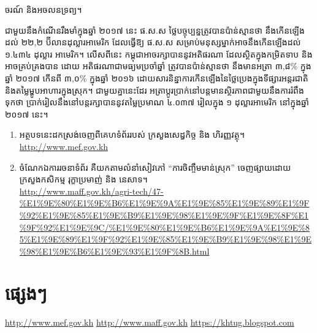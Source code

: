 \documentclass{maff}
\begin{document}
ចរណ៍ និង​អចលនទ្រព្យ។
\par
ជាមួយនឹង​កំណើន​រឹងមាំ​ក្នុង​ឆ្នាំ ២០១៧ នេះ ផ.ស.ស ថ្លៃ​បច្ចុប្បន្ន​ត្រូវបាន​ប៉ាន់ស្មាន​ថា នឹង​កើនឡើង​ដល់ ២២,២ ប៊ីលាន​ដុល្លារ​អាមេរិក  ដែល​ធ្វើឱ្យ ផ.ស.ស សម្រាប់​មនុស្ស​ម្នាក់​អាច​នឹង​កើន​ឡើងដល់ ១.៤៣៤ ដុល្លារ អាមេរិក។ លើសពីនេះ កម្ពុជា​អាច​រក្សាបាន​នូវ​អតិផរណា ដែល​ស្ថិតក្នុង​កម្រិតទាប និង​អាច​គ្រប់គ្រង​បាន ដោយ អតិផរណា​ជាមធ្យម​ប្រចាំឆ្នាំ ត្រូវបាន​ប៉ាន់ស្មាន​ថា នឹងមាន​អត្រា ៣,៨\% ក្នុង​ឆ្នាំ ២០១៧ កើន​ពី ៣,០\% ក្នុង​ឆ្នាំ ២០១៦ ដោយសារ​និន្នាការ​កើនឡើង​នៃ​ថ្លៃ​ប្រេង​ក្នុង​ទីផ្សារ​អន្តរជាតិ និង​តម្លៃ​ម្ហូបអាហារ​ក្នុងស្រុក។ ជាមួយគ្នានេះដែរ អត្រា​ប្តូរប្រាក់​នៅ​បន្ត​មាន​ស្ថិរភាព​ជាមួយនឹង​ការរំពឹងទុក​ថា ប្រាក់រៀល​នឹង​នៅ​បន្ត​រក្សាបាន​នូវ​តម្លៃ​ប្រមាណ ៤.០៣៧ រៀល​ក្នុង ១ ដុល្លារ​អាមេរិក នៅក្នុង​ឆ្នាំ ២០១៧ នេះ។
\begin{tcolorbox}[title={សម្គាល់!}]
	\strut
	\begin{enumerate}[k]
		\item អត្ថបទនេះដកស្រង់ចេញពីគេហទំព័ររបស់ ក្រសួងសេដ្ធកិច្ច និង ហិរញ្ញវត្ថុ។\\
		\url{http://www.mef.gov.kh}\\
		\item ចំណែកឯការរចនាទំព័រ គឺយកតាមលំនាំសៀវភៅ ``ការចិញ្ចឹមមាន់ស្រុក'' ចេញផ្សាយដោយ ក្រសួងកសិកម្ម រុក្ខាប្រមាញ់ និង នេសាទ។\\
		\url{http://www.maff.gov.kh/agri-tech/47-%E1%9E%80%E1%9E%B6%E1%9E%9A%E1%9E%85%E1%9E%89%E1%9F%92%E1%9E%85%E1%9E%B9%E1%9E%98%E1%9E%9F%E1%9E%8F%E1%9F%92%E1%9E%9C/%E1%9E%80%E1%9E%B6%E1%9E%9A%E1%9E%85%E1%9E%89%E1%9F%92%E1%9E%85%E1%9E%B9%E1%9E%98%E1%9E%98%E1%9E%B6%E1%9E%93%E1%9F%8B.html}
	\end{enumerate}
\end{tcolorbox}
\appendix
\chapter{ផ្សេងៗ}
\backmatter
\begin{thebibliography}{2}
	 \url{http://www.mef.gov.kh}
	 \url{http://www.maff.gov.kh}
	 \url{https://khtug.blogspot.com}
\end{thebibliography}
\end{document}
